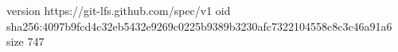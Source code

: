 version https://git-lfs.github.com/spec/v1
oid sha256:4097b9fcd4c32eb5432e9269c0225b9389b3230afc7322104558c8c3c46a91a6
size 747
